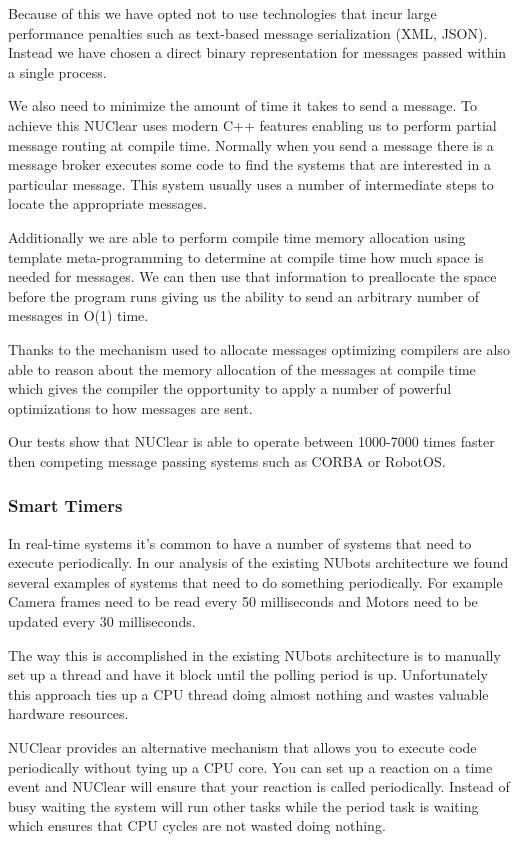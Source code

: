 \documentclass[english,12pt]{scrartcl}
\begin{document}
				Because of this we have opted not to use technologies that incur large performance penalties such as text-based message serialization (XML, JSON).
				Instead we have chosen a direct binary representation for messages passed within a single process. 
				
				We also need to minimize the amount of time it takes to send a message. 
				To achieve this NUClear uses modern C++ features enabling us to perform partial message routing at compile time.
				Normally when you send a message there is a message broker executes some code to find the systems that are interested in a particular message.
				This system usually uses a number of intermediate steps to locate the appropriate messages.
				
				Additionally we are able to perform compile time memory allocation using template meta-programming to determine at compile time how much space is needed for messages.
				We can then use that information to preallocate the space before the program runs giving us the ability to send an arbitrary number of messages in O(1) time.
			
				Thanks to the mechanism used to allocate messages optimizing compilers are also able to reason about the memory allocation of the messages at compile time which gives the compiler the opportunity to apply a number of powerful optimizations to how messages are sent.
				
				Our tests show that NUClear is able to operate between 1000-7000 times faster then competing message passing systems such as CORBA or RobotOS.
				
			\subsubsection{Smart Timers}
				In real-time systems it's common to have a number of systems that need to execute periodically. 
				In our analysis of the existing NUbots architecture we found several examples of systems that need to do something periodically.
				For example Camera frames need to be read every 50 milliseconds and Motors need to be updated every 30 milliseconds. 
				
				The way this is accomplished in the existing NUbots architecture is to manually set up a thread and have it block until the polling period is up. 
				Unfortunately this approach ties up a CPU thread doing almost nothing and wastes valuable hardware resources.
				
				NUClear provides an alternative mechanism that allows you to execute code periodically without tying up a CPU core.
				You can set up a reaction on a time event and NUClear will ensure that your reaction is called periodically. 
				Instead of busy waiting the system will run other tasks while the period task is waiting which ensures that CPU cycles are not wasted doing nothing.	
				
\end{document}
